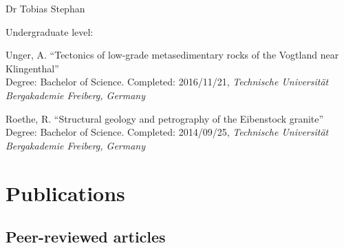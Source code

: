 \documentclass[10pt, paper=letter]{scrartcl} %
\begin{document}
\begin{cv}{\textcolor{myred}{\textsf{Dr Tobias Stephan}}}
\begin{cvlist}{Undergraduate level:}
        \item[2] Unger, A. \enquote{Tectonics of low-grade metasedimentary rocks of the Vogtland near Kling\-en\-thal}\\
        Degree: Bachelor of Science. Completed: 2016/11/21, \textit{Technische Universität Bergakademie Freiberg, Germany}

        \item[1] Roethe, R. \enquote{Structural geology and petrography of the Eibenstock granite}\\
        Degree: Bachelor of Science. Completed: 2014/09/25, \textit{Technische Universität Bergakademie Freiberg, Germany}
    \end{cvlist}


    \section{Publications}
    \subsection{Peer-reviewed articles}

    \begingroup
    \setlength{\cvlabelwidth}{1em}
    \setul{1pt}{.4pt}%
    \begin{cvlist}{}


\end{cvlist}
\end{cv}
\end{document}
